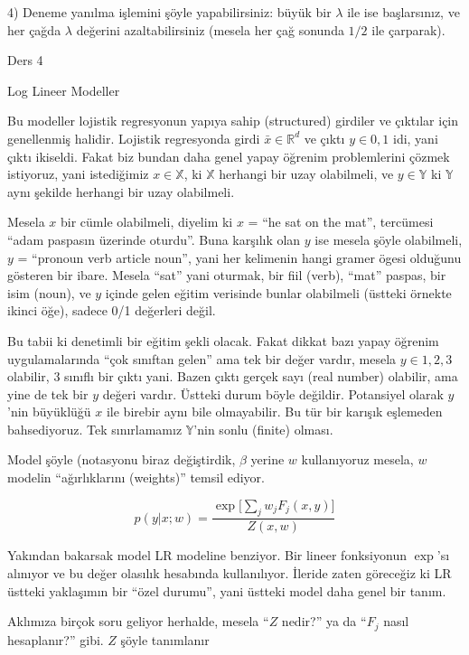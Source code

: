 \documentclass[12pt,fleqn]{article}\usepackage{../../common}
\begin{document}
4) Deneme yanılma işlemini şöyle yapabilirsiniz: büyük bir $\lambda$ ile
ise başlarsınız, ve her çağda $\lambda$ değerini azaltabilirsiniz (mesela
her çağ sonunda $1/2$ ile çarparak).

Ders 4

Log Lineer Modeller

Bu modeller lojistik regresyonun yapıya sahip (structured) girdiler ve
çıktılar için genellenmiş halidir. Lojistik regresyonda girdi $\bar{x} \in
\mathbb{R}^d$ ve çıktı $y \in {0,1}$ idi, yani çıktı ikiseldi. Fakat biz bundan 
daha genel yapay öğrenim problemlerini çözmek istiyoruz, yani 
istediğimiz $x \in \mathbb{X}$, ki $\mathbb{X}$ herhangi bir 
uzay olabilmeli, ve $y \in \mathbb{Y}$ ki $\mathbb{Y}$ aynı şekilde
herhangi  bir uzay olabilmeli. 

Mesela $x$ bir cümle olabilmeli, diyelim ki $x$ = ``he sat on the mat'',
tercümesi ``adam paspasın üzerinde oturdu''. Buna karşılık olan $y$ ise
mesela şöyle olabilmeli, $y$ = ``pronoun verb article noun'', yani her
kelimenin hangi gramer ögesi olduğunu gösteren bir ibare. Mesela ``sat''
yani oturmak, bir fiil (verb), ``mat'' paspas, bir isim (noun), ve $y$
içinde gelen eğitim verisinde bunlar olabilmeli (üstteki örnekte ikinci
öğe), sadece 0/1 değerleri değil.

Bu tabii ki denetimli bir eğitim şekli olacak. Fakat dikkat bazı yapay
öğrenim uygulamalarında ``çok sınıftan gelen'' ama tek bir değer vardır,
mesela $y \in {1,2,3}$ olabilir, 3 sınıflı bir çıktı yani. Bazen çıktı
gerçek sayı (real number) olabilir, ama yine de tek bir $y$ değeri
vardır. Üstteki durum böyle değildir. Potansiyel olarak $y$'nin büyüklüğü
$x$ ile birebir aynı bile olmayabilir. Bu tür bir karışık eşlemeden
bahsediyoruz.  Tek sınırlamamız $\mathbb{Y}$'nin sonlu (finite) olması.

Model şöyle (notasyonu biraz değiştirdik, $\beta$ yerine $w$ kullanıyoruz
mesela, $w$ modelin ``ağırlıklarını (weights)'' temsil ediyor. 

$$ p(y|x;w) = 
\frac{\exp \big[ \sum_{j} w_j F_j (x,y) \big]}{Z(x,w)}
$$

Yakından bakarsak model LR modeline benziyor. Bir lineer fonksiyonun
$\exp$'sı alınıyor ve bu değer olasılık hesabında kullanılıyor. İleride
zaten göreceğiz ki LR üstteki yaklaşımın bir ``özel durumu'', yani üstteki
model daha genel bir tanım. 

Aklımıza birçok soru geliyor herhalde, mesela ``$Z$ nedir?'' ya da ``$F_j$
nasıl hesaplanır?'' gibi. $Z$ şöyle tanımlanır
\end{document}
